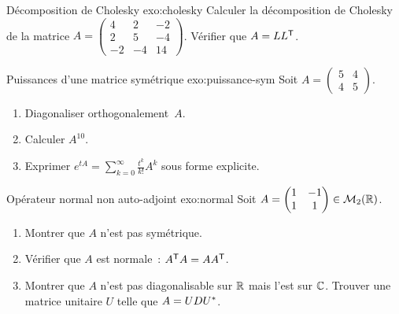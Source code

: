 \begin{exercise}{Décomposition de Cholesky \intermediate}{exo:cholesky}
  Calculer la décomposition de Cholesky de la matrice
  $A = \begin{pmatrix} 4 & 2 & -2 \\ 2 & 5 & -4 \\ -2 & -4 & 14 \end{pmatrix}$.
  Vérifier que $A = L{L}^{\mathsf{T}}$.
\end{exercise}

\begin{exercise}{Puissances d'une matrice symétrique \intermediate}{exo:puissance-sym}
  Soit $A = \begin{pmatrix} 5 & 4 \\ 4 & 5 \end{pmatrix}$.
  \begin{enumerate}[label=(\alph*)]
    \item Diagonaliser orthogonalement~$A$.
    \item Calculer $A^{10}$.
    \item Exprimer $e^{tA} = \sum_{k=0}^{\infty} \frac{t^k}{k!} A^k$
      sous forme explicite.
  \end{enumerate}
\end{exercise}

\begin{exercise}{Opérateur normal non auto-adjoint \intermediate}{exo:normal}
  Soit $A = \begin{pmatrix} 1 & -1 \\ 1 & 1 \end{pmatrix} \in \mathcal{M}_2({\mathbb{R}})$.
  \begin{enumerate}[label=(\alph*)]
    \item Montrer que $A$ n'est pas symétrique.
    \item Vérifier que $A$ est normale~: ${A}^{\mathsf{T}}A = A{A}^{\mathsf{T}}$.
    \item Montrer que $A$ n'est pas diagonalisable sur ${\mathbb{R}}$ mais
      l'est sur ${\mathbb{C}}$. Trouver une matrice unitaire $U$ telle que
      $A = U D {U}^{*}$.
  \end{enumerate}
\end{exercise}

